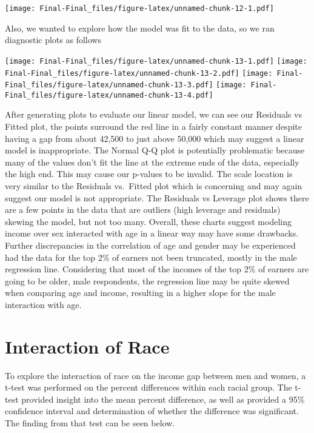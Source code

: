 \documentclass[
]{article}
\begin{document}
\texttt{[image: Final-Final\_files/figure-latex/unnamed-chunk-12-1.pdf]}

Also, we wanted to explore how the model was fit to the data, so we ran
diagnostic plots as follows

\texttt{[image: Final-Final\_files/figure-latex/unnamed-chunk-13-1.pdf]}
\texttt{[image: Final-Final\_files/figure-latex/unnamed-chunk-13-2.pdf]}
\texttt{[image: Final-Final\_files/figure-latex/unnamed-chunk-13-3.pdf]}
\texttt{[image: Final-Final\_files/figure-latex/unnamed-chunk-13-4.pdf]}

After generating plots to evaluate our linear model, we can see our
Residuals vs Fitted plot, the points surround the red line in a fairly
constant manner despite having a gap from about 42,500 to just above
50,000 which may suggest a linear model is inappropriate. The Normal Q-Q
plot is potentially problematic because many of the values don't fit the
line at the extreme ends of the data, especially the high end. This may
cause our p-values to be invalid. The scale location is very similar to
the Residuals vs.~Fitted plot which is concerning and may again suggest
our model is not appropriate. The Residuals vs Leverage plot shows there
are a few points in the data that are outliers (high leverage and
residuals) skewing the model, but not too many. Overall, these charts
suggest modeling income over sex interacted with age in a linear way may
have some drawbacks. Further discrepancies in the correlation of age and
gender may be experienced had the data for the top 2\% of earners not
been truncated, mostly in the male regression line. Considering that
most of the incomes of the top 2\% of earners are going to be older,
male respondents, the regression line may be quite skewed when comparing
age and income, resulting in a higher slope for the male interaction
with age.

\hypertarget{interaction-of-race}{%
\section{Interaction of Race}\label{interaction-of-race}}

To explore the interaction of race on the income gap between men and
women, a t-test was performed on the percent differences within each
racial group. The t-test provided insight into the mean percent
difference, as well as provided a 95\% confidence interval and
determination of whether the difference was significant. The finding
from that test can be seen below.
\end{document}
